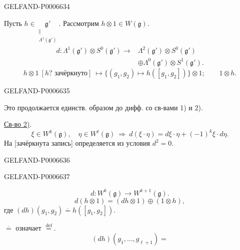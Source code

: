 \begin{GelfandAdjacentEvidence}{GELFAND-P000663}{4}


Пусть \(h\in\underset{\substack{\Vert\\\Lambda^1(\mathfrak g')}}{\mathfrak g'}\).
Рассмотрим \(h\otimes1\in W(\mathfrak g)\).
\[
\begin{aligned}
d:\Lambda^1(\mathfrak g')\otimes S^0(\mathfrak g')\to{}&
\Lambda^2(\mathfrak g')\otimes S^0(\mathfrak g')\\
&\oplus\Lambda^0(\mathfrak g')\otimes S^1(\mathfrak g').
\end{aligned}
\]
\[
h\otimes1\ [h\text{? зачёркнуто}]\ \mapsto
\bigl\{(g_1,g_2)\mapsto h([g_1,g_2])\bigr\}\otimes1;\qquad 1\otimes h.
\]
\end{GelfandAdjacentEvidence}
\begin{GelfandAdjacentEvidence}{GELFAND-P000663}{5}

Это продолжается единств. образом до дифф. со св-вами 1) и 2).

\underline{Св-во 2)}.
\[
\xi\in W^k(\mathfrak g),\quad\eta\in W^\ell(\mathfrak g)
\ \Longrightarrow\ d(\xi\cdot\eta)=d\xi\cdot\eta+(-1)^k\xi\cdot d\eta.
\]
На [зачёркнута запись] определяется из условия \(d^2=0\).
\end{GelfandAdjacentEvidence}
\begin{GelfandAdjacentEvidence}{GELFAND-P000663}{6}

\end{GelfandAdjacentEvidence}
\begin{GelfandAdjacentEvidence}{GELFAND-P000663}{7}

\[
d:W^k(\mathfrak g)\to W^{k+1}(\mathfrak g).
\]
\[
d(h\otimes1)=(dh\otimes1)\oplus(1\otimes h),
\]
где \((dh)(g_1,g_2)\overset{\cdot}{=}h([g_1,g_2])\).

\(\overset{\cdot}{=}\) означает \(\overset{\mathrm{def}}{=}\).
\[
(dh)(g_1,\ldots,g_{\ell+1})=
\]
\end{GelfandAdjacentEvidence}
